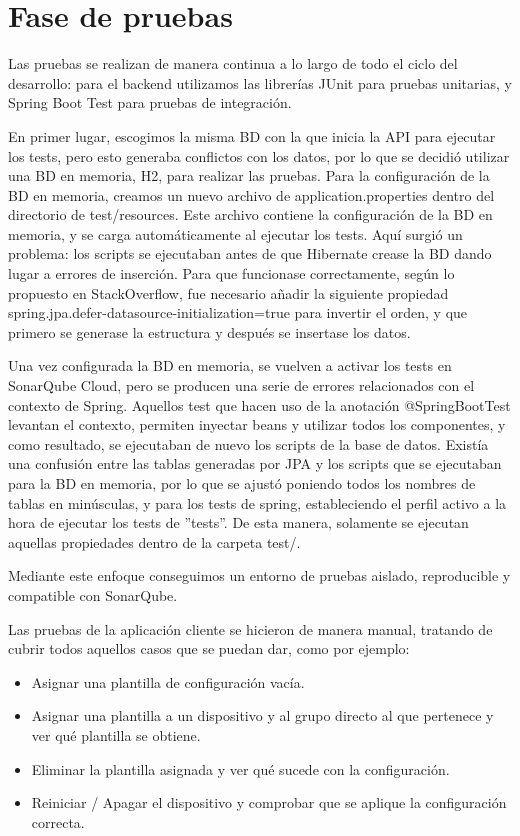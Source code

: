 \section{Fase de pruebas}\label{sec:fase-de-pruebas}

Las pruebas se realizan de manera continua a lo largo de todo el ciclo del desarrollo: para el backend utilizamos las
librerías JUnit para pruebas unitarias, y Spring Boot Test para pruebas de integración.

En primer lugar, escogimos la misma BD con la que inicia la API para ejecutar los tests, pero esto generaba
conflictos con los datos, por lo que se decidió utilizar una BD en memoria, H2, para realizar las pruebas.
Para la configuración de la BD en memoria, creamos un nuevo archivo de application.properties dentro del directorio
de test/resources.
Este archivo contiene la configuración de la BD en memoria, y se carga automáticamente al ejecutar los tests.
Aquí surgió un problema: los scripts se ejecutaban antes de que Hibernate crease la BD dando lugar a errores de inserción.
Para que funcionase correctamente, según lo propuesto en StackOverflow\cite{stackoverflowSpringBootError},
fue necesario añadir la siguiente propiedad spring.jpa.defer-datasource-initialization=true para invertir el orden, y
que primero se generase la estructura y después se insertase los datos.

Una vez configurada la BD en memoria, se vuelven a activar los tests en SonarQube Cloud, pero se producen una serie
de errores relacionados con el contexto de Spring.
Aquellos test que hacen uso de la anotación @SpringBootTest levantan el contexto, permiten inyectar beans y utilizar
todos los componentes, y como resultado, se ejecutaban de nuevo los scripts de la base de datos.
Existía una confusión entre las tablas generadas por JPA y los scripts que se ejecutaban para la BD en memoria,
por lo que se ajustó poniendo todos los nombres de tablas en minúsculas, y para los tests de spring,
estableciendo el perfil activo a la hora de ejecutar los tests de ''tests''.
De esta manera, solamente se ejecutan aquellas propiedades dentro de la carpeta test/.

Mediante este enfoque conseguimos un entorno de pruebas aislado, reproducible y compatible con SonarQube.


Las pruebas de la aplicación cliente se hicieron de manera manual, tratando de cubrir todos aquellos casos que
se puedan dar, como por ejemplo:
\begin{itemize}
    \item Asignar una plantilla de configuración vacía.
    \item Asignar una plantilla a un dispositivo y al grupo directo al que pertenece y ver qué plantilla se obtiene.
    \item Eliminar la plantilla asignada y ver qué sucede con la configuración.
    \item Reiniciar / Apagar el dispositivo y comprobar que se aplique la configuración correcta.
\end{itemize}

